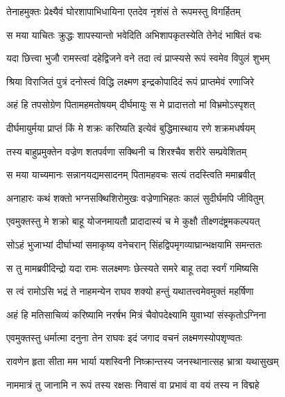 \twolineshloka
{तेनाहमुक्तः प्रेक्ष्यैवं घोरशापाभिधायिना}
{एतदेव नृशंसं ते रूपमस्तु विगर्हितम्} %

\twolineshloka
{स मया याचितः क्रुद्धः शापस्यान्तो भवेदिति}
{अभिशापकृतस्येति तेनेदं भाषितं वचः} %

\twolineshloka
{यदा छित्त्वा भुजौ रामस्त्वां दहेद्विजने वने}
{तदा त्वं प्राप्स्यसे रूपं स्वमेव विपुलं शुभम्} %

\twolineshloka
{श्रिया विराजितं पुत्रं दनोस्त्वं विद्धि लक्ष्मण}
{इन्द्रकोपादिदं रूपं प्राप्तमेवं रणाजिरे} %

\twolineshloka
{अहं हि तपसोग्रेण पितामहमतोषयम्}
{दीर्घमायुः स मे प्रादात्ततो मां विभ्रमोऽस्पृशत्} %

\twolineshloka
{दीर्घमायुर्मया प्राप्तं किं मे शक्रः करिष्यति}
{इत्येवं बुद्धिमास्थाय रणे शक्रमधर्षयम्} %

\twolineshloka
{तस्य बाहुप्रमुक्तेन वज्रेण शतपर्वणा}
{सक्थिनी च शिरश्चैव शरीरे सम्प्रवेशितम्} %

\twolineshloka
{स मया याच्यमानः सन्नानयद्यमसादनम्}
{पितामहवचः सत्यं तदस्त्विति ममाब्रवीत्} %

\twolineshloka
{अनाहारः कथं शक्तो भग्नसक्थिशिरोमुखः}
{वज्रेणाभिहतः कालं सुदीर्घमपि जीवितुम्} %

\twolineshloka
{एवमुक्तस्तु मे शक्रो बाहू योजनमायतौ}
{प्रादादास्यं च मे कुक्षौ तीक्ष्णदंष्ट्रमकल्पयत्} %

\twolineshloka
{सोऽहं भुजाभ्यां दीर्घाभ्यां समाकृष्य वनेचरान्}
{सिंहद्विपमृगव्याघ्रान्भक्षयामि समन्ततः} %

\twolineshloka
{स तु मामब्रवीदिन्द्रो यदा रामः सलक्ष्मणः}
{छेत्स्यते समरे बाहू तदा स्वर्गं गमिष्यसि} %

\twolineshloka
{स त्वं रामोऽसि भद्रं ते नाहमन्येन राघव}
{शक्यो हन्तुं यथातत्त्वमेवमुक्तं महर्षिणा} %

\twolineshloka
{अहं हि मतिसाचिव्यं करिष्यामि नरर्षभ}
{मित्रं चैवोपदेक्ष्यामि युवाभ्यां संस्कृतोऽग्निना} %

\twolineshloka
{एवमुक्तस्तु धर्मात्मा दनुना तेन राघवः}
{इदं जगाद वचनं लक्ष्मणस्योपशृण्वतः} %

\twolineshloka
{रावणेन हृता सीता मम भार्या यशस्विनी}
{निष्क्रान्तस्य जनस्थानात्सह भ्रात्रा यथासुखम्} %

\twolineshloka
{नाममात्रं तु जानामि न रूपं तस्य रक्षसः}
{निवासं वा प्रभावं वा वयं तस्य न विद्महे} %


